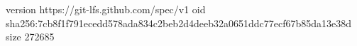 version https://git-lfs.github.com/spec/v1
oid sha256:7cb8f1f791ecedd578ada834c2beb2d4deeb32a0651ddc77ecf67b85da13e38d
size 272685
